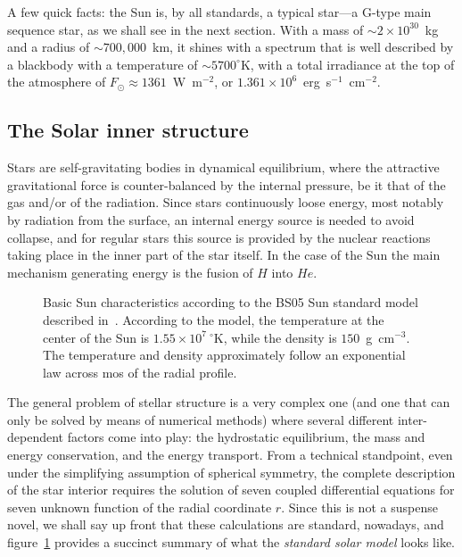 
A few quick facts: the Sun is, by all standards, a typical star---a G-type main
sequence star, as we shall see in the next section. With a mass of $\sim 2 \times 10^{30}$~kg and
a radius of $\sim 700,000$~km, it shines with a spectrum that is well described by
a blackbody with a temperature of $\sim 5700^\circ$K, with a total irradiance at
the top of the atmosphere of $F_\odot \approx 1361$~W~m$^{-2}$, or
$1.361 \times 10^6$~erg~s$^{-1}$~cm$^{-2}$.


\subsection{The Solar inner structure}

Stars are self-gravitating bodies in dynamical equilibrium, where the attractive
gravitational force is counter-balanced by the internal pressure, be it that of
the gas and/or of the radiation. Since stars continuously loose energy, most notably
by radiation from the surface, an internal energy source is needed to avoid collapse,
and for regular stars this source is provided by the nuclear reactions taking place
in the inner part of the star itself. In the case of the Sun the main mechanism
generating energy is the fusion of $H$ into $He$.


\begin{figure}[htbp!]
	
	\caption{Basic Sun characteristics according to the BS05 Sun standard model
  described in~\cite{2005ApJ...621L..85B}. According to the model, the temperature
  at the center of the Sun is $1.55 \times 10^7~^\circ$K, while the density is $150$~g~cm$^{-3}$.
  The temperature and density approximately follow an exponential law across mos
  of the radial profile.}
    \label{fig:sun_standard_model}
\end{figure}

The general problem of stellar structure is a very complex one (and one that can
only be solved by means of numerical methods) where several different inter-dependent
factors come into play: the hydrostatic equilibrium, the mass and energy conservation,
and the energy transport. From a technical standpoint, even under the simplifying
assumption of spherical symmetry, the complete description of the star interior
requires the solution of seven coupled differential equations for seven unknown
function of the radial coordinate $r$. Since this is not a suspense novel, we
shall say up front that these calculations are standard, nowadays, and
figure~\ref{fig:sun_standard_model} provides a succinct summary of what the
\emph{standard solar model} looks like.

